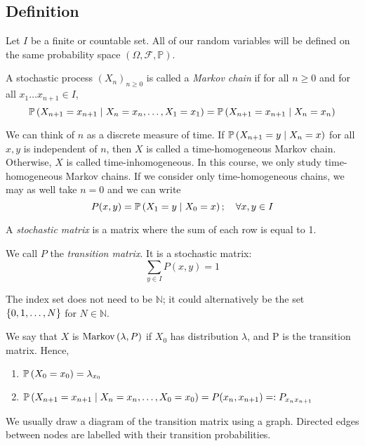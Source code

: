 \subsection{Definition}
Let \( I \) be a finite or countable set.
All of our random variables will be defined on the same probability space \( (\Omega, \mathcal F, \mathbb P) \).
\begin{definition}
	A stochastic process \( (X_n)_{n \geq 0} \) is called a \textit{Markov chain} if for all \( n \geq 0 \) and for all \( x_1 \dots x_{n+1} \in I \),
	\[
		\mathbb{P}\left({X_{n+1} = x_{n+1} \mid X_n = x_n, \dots,X_1 = x_1}\right) = \mathbb{P}\left({X_{n+1} = x_{n+1} \mid X_n = x_n}\right)
	\]
\end{definition}
We can think of \( n \) as a discrete measure of time.
If \( \mathbb{P}\left({X_{n+1} = y \mid X_n = x}\right) \) for all \( x, y \) is independent of \( n \), then \( X \) is called a time-homogeneous Markov chain.
Otherwise, \( X \) is called time-inhomogeneous.
In this course, we only study time-homogeneous Markov chains.
If we consider only time-homogeneous chains, we may as well take \( n = 0 \) and we can write
\[
	P(x,y) = \mathbb{P}\left({X_1 = y \mid X_0 = x}\right);\quad \forall x,y \in I
\]
\begin{definition}
	A \textit{stochastic matrix} is a matrix where the sum of each row is equal to 1.
\end{definition}
We call \( P \) the \textit{transition matrix}.
It is a stochastic matrix:
\[
	\sum_{y \in I} P(x,y) = 1
\]
\begin{remark}
	The index set does not need to be \( \mathbb N \); it could alternatively be the set \( \qty{0,1,\dots,N} \) for \( N \in \mathbb N \).
\end{remark}
We say that \( X \) is \(\operatorname{Markov}\left({\lambda, P}\right)\) if \( X_0 \) has distribution \(\lambda\), and P is the transition matrix.
Hence,
\begin{enumerate}
	\item \( \mathbb{P}\left({X_0 = x_0}\right) = \lambda_{x_0} \)
	\item \( \mathbb{P}\left({X_{n+1} = x_{n+1} \mid X_n = x_n, \dots, X_0 = x_0}\right) = P(x_n, x_{n+1}) =: P_{x_n x_{n+1}} \)
\end{enumerate}
We usually draw a diagram of the transition matrix using a graph.
Directed edges between nodes are labelled with their transition probabilities.

